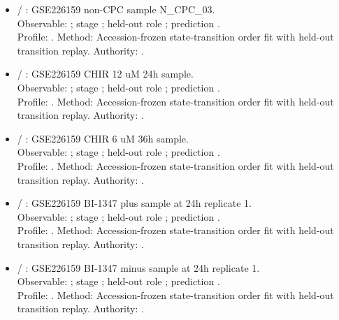 \begin{itemize}
\item {} / : GSE226159 non-CPC sample N\_CPC\_03.\\ Observable: ; stage ; held-out role ; prediction .\\ Profile: . Method: Accession-frozen state-transition order fit with held-out transition replay. Authority: .
\item {} / : GSE226159 CHIR 12 uM 24h sample.\\ Observable: ; stage ; held-out role ; prediction .\\ Profile: . Method: Accession-frozen state-transition order fit with held-out transition replay. Authority: .
\item {} / : GSE226159 CHIR 6 uM 36h sample.\\ Observable: ; stage ; held-out role ; prediction .\\ Profile: . Method: Accession-frozen state-transition order fit with held-out transition replay. Authority: .
\item {} / : GSE226159 BI-1347 plus sample at 24h replicate 1.\\ Observable: ; stage ; held-out role ; prediction .\\ Profile: . Method: Accession-frozen state-transition order fit with held-out transition replay. Authority: .
\item {} / : GSE226159 BI-1347 minus sample at 24h replicate 1.\\ Observable: ; stage ; held-out role ; prediction .\\ Profile: . Method: Accession-frozen state-transition order fit with held-out transition replay. Authority: .

\end{itemize}
